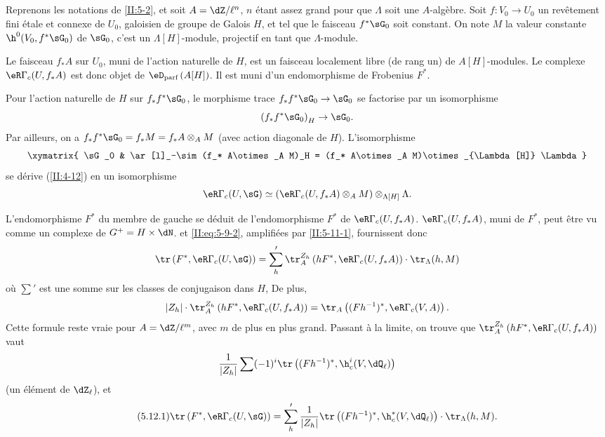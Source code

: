 \subsection{}\label{II:5-12}

Reprenons les notations de \ref{II:5-2}, et soit $A=\dZ/\ell^n$, $n$ étant 
assez grand pour que $\Lambda$ soit une $A$-algèbre. Soit $f:V_0\to U_0$ un 
revêtement fini étale et connexe de $U_0$, galoisien de groupe de Galois 
$H$, et tel que le faisceau $f^*\sG_0$ soit constant. On note $M$ la valeur 
constante $\h^0(V_0,f^*\sG_0)$ de $\sG_0$, c'est un $\Lambda[H]$-module, projectif en 
tant que $\Lambda$-module. 

Le faisceau $f_* A$ sur $U_0$, muni de l'action naturelle de $H$, est un 
faisceau localement libre (de rang un) de $A[H]$-modules. Le complexe 
$\eR\Gamma_c(U,f_* A)$ est donc objet de $\eD_\text{parf}\left(A[H]\right)$. Il 
est muni d'un endomorphisme de Frobenius $F^*$. 

Pour l'action naturelle de $H$ sur $f_* f^*\sG_0$, le morphisme trace 
$f_* f^*\sG_0\to\sG_0$ se factorise par un isomorphisme 
\[
  \left(f_* f^*\sG_0\right)_H \to \sG_0 \text{.}
\]
Par ailleurs, on a $f_* f^*\sG_0=f_* M=f_* A\otimes_A M$ (avec action diagonale de 
$H$). L'isomorphisme 
\[\xymatrix{
  \sG_0 
    & \ar[l]_-\sim (f_* A\otimes_A M)_H = (f_* A\otimes_A M)\otimes_{\Lambda[H]} \Lambda
}\]
se dérive (\ref{II:4-12}) en un isomorphisme 
\[
  \eR\Gamma_c(U,\sG) \simeq \left(\eR\Gamma_c(U,f_* A)\otimes_A M\right)\otimes_{\Lambda[H]} \Lambda \text{.}
\]

L'endomorphisme $F^*$ du membre de gauche se déduit de l'endomorphisme 
$F^*$ de $\eR\Gamma_c(U,f_* A)$.  
$\eR\Gamma_c(U,f_* A)$, muni de $F^*$, peut être vu comme un complexe de 
 $G^+=H\times \dN$.  
et \eqref{II:eq:5-9-2}, amplifiées par \ref{II:5-11-1}, fournissent donc 
\[
  \tr\left(F^*,\eR\Gamma_c(U,\sG)\right) = \sum_h' \tr_A^{Z_h}\left(h F^*,\eR\Gamma_c(U,f_* A)\right)\cdot \tr_\Lambda(h,M)
\]
où $\sum'$ est une somme sur les classes de conjugaison dans $H$, De plus, 
\[
  |Z_h|\cdot \tr_A^{Z_h}\left(h F^*,\eR\Gamma_c(U,f_* A)\right) = \tr_A\left((F h^{-1})^*,\eR\Gamma_c(V,A)\right) \text{.}
\]
Cette formule reste vraie pour $A=\dZ/\ell^m$, avec $m$ de plus en plus grand. 
Passant à la limite, on trouve que 
$\tr_A^{Z_h}\left(h F^*,\eR\Gamma_c(U,f_* A)\right)$ vaut 
\[
  \frac{1}{|Z_h|} \sum (-1)^i \tr\left((F h^{-1})^*,\h_c^i(V,\dQ_\ell)\right)
\]
(un élément de $\dZ_\ell$), et
\begin{equation*}\tag{5.12.1}\label{II:eq:5-12-1}
\tr\left(F^*,\eR\Gamma_c(U,\sG)\right) = \sum_h' \frac{1}{|Z_h|} \tr\left((F h^{-1})^*,\h_c^*(V,\dQ_\ell)\right)\cdot \tr_\Lambda(h,M) \text{.} 
\end{equation*}





